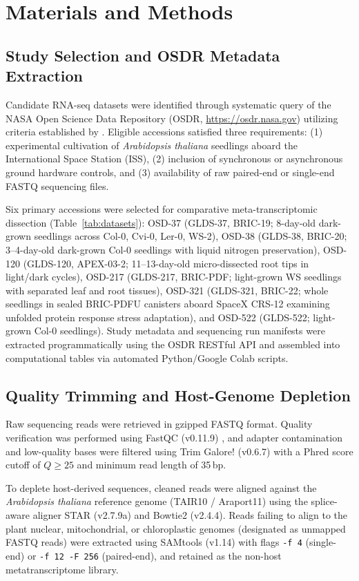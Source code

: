 \section{Materials and Methods}
\label{sec:methods}

\subsection{Study Selection and OSDR Metadata Extraction}
Candidate RNA-seq datasets were identified through systematic query of the NASA Open Science Data Repository (OSDR, \url{https://osdr.nasa.gov}) utilizing criteria established by \citet{barker2023meta}. Eligible accessions satisfied three requirements: (1) experimental cultivation of \textit{Arabidopsis thaliana} seedlings aboard the International Space Station (ISS), (2) inclusion of synchronous or asynchronous ground hardware controls, and (3) availability of raw paired-end or single-end FASTQ sequencing files. 

Six primary accessions were selected for comparative meta-transcriptomic dissection (Table~\ref{tab:datasets}): OSD-37 (GLDS-37, BRIC-19; 8-day-old dark-grown seedlings across Col-0, Cvi-0, Ler-0, WS-2), OSD-38 (GLDS-38, BRIC-20; 3--4-day-old dark-grown Col-0 seedlings with liquid nitrogen preservation), OSD-120 (GLDS-120, APEX-03-2; 11--13-day-old micro-dissected root tips in light/dark cycles), OSD-217 (GLDS-217, BRIC-PDF; light-grown WS seedlings with separated leaf and root tissues), OSD-321 (GLDS-321, BRIC-22; whole seedlings in sealed BRIC-PDFU canisters aboard SpaceX CRS-12 examining unfolded protein response stress adaptation), and OSD-522 (GLDS-522; light-grown Col-0 seedlings). Study metadata and sequencing run manifests were extracted programmatically using the OSDR RESTful API and assembled into computational tables via automated Python/Google Colab scripts.

\subsection{Quality Trimming and Host-Genome Depletion}
Raw sequencing reads were retrieved in gzipped FASTQ format. Quality verification was performed using FastQC (v0.11.9) \citep{ewels2016multiqc}, and adapter contamination and low-quality bases were filtered using Trim Galore! (v0.6.7) with a Phred score cutoff of $Q \ge 25$ and minimum read length of 35\,bp. 

To deplete host-derived sequences, cleaned reads were aligned against the \textit{Arabidopsis thaliana} reference genome (TAIR10 / Araport11) using the splice-aware aligner STAR (v2.7.9a) and Bowtie2 (v2.4.4). Reads failing to align to the plant nuclear, mitochondrial, or chloroplastic genomes (designated as unmapped FASTQ reads) were extracted using SAMtools (v1.14) with flags \texttt{-f 4} (single-end) or \texttt{-f 12 -F 256} (paired-end), and retained as the non-host metatranscriptome library.


